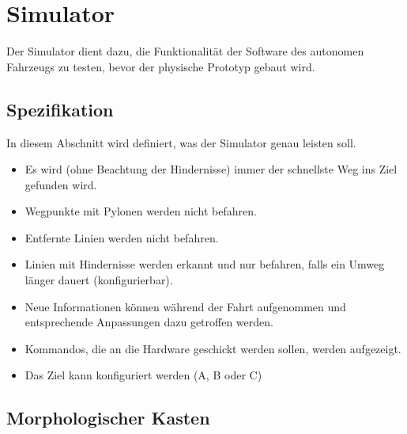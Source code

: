 \documentclass[../main.tex]{subfiles}
\begin{document}
\newpage
\section{Simulator}

Der Simulator dient dazu, die Funktionalität der Software des autonomen Fahrzeugs zu testen, bevor der physische Prototyp gebaut wird.

\subsection{Spezifikation}

In diesem Abschnitt wird definiert, was der Simulator genau leisten soll.


\begin{itemize}
    \item Es wird (ohne Beachtung der Hindernisse) immer der schnellste Weg ins Ziel gefunden wird.
    \item Wegpunkte mit Pylonen werden nicht befahren.
    \item Entfernte Linien werden nicht befahren.
    \item Linien mit Hindernisse werden erkannt und nur befahren, falls ein Umweg länger dauert (konfigurierbar).
    \item Neue Informationen können während der Fahrt aufgenommen und entsprechende Anpassungen dazu getroffen werden.
    \item Kommandos, die an die Hardware geschickt werden sollen, werden aufgezeigt.
    \item Das Ziel kann konfiguriert werden (A, B oder C)
\end{itemize}



\subsection{Morphologischer Kasten}
\end{document}
